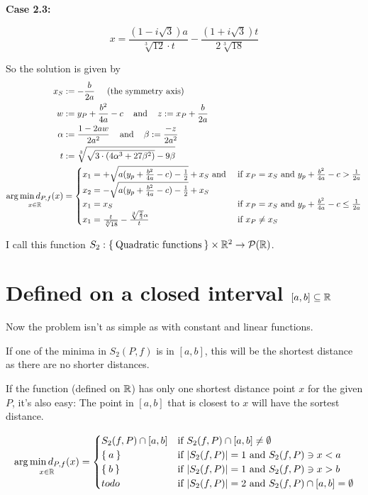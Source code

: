 \textbf{Case 2.3:} 

\[x = \frac{(1-i \sqrt{3})a}{\sqrt[3]{12} \cdot t}
     -\frac{(1+i\sqrt{3}) t}{2\sqrt[3]{18}}\]

\goodbreak
So the solution is given by
\begin{align*}
x_S &:= - \frac{b}{2a} \;\;\;\;\; \text{(the symmetry axis)}\\
w &:= y_P+\frac{b^2}{4a}-c \;\;\; \text{ and } \;\;\; z := x_P+\frac{b}{2a}\\
\alpha &:= \frac{1- 2 aw}{2 a^2} \;\;\;\text{ and }\;\;\; \beta := \frac{-z}{2 a^2}\\
t &:= \sqrt[3]{\sqrt{3 \cdot (4 \alpha^3 + 27 \beta^2)} -9\beta}\\
\underset{x\in\mathbb{R}}{\arg \min d_{P,f}(x)} &= \begin{cases}
     x_1 = +\sqrt{a (y_p + \frac{b^2}{4a} - c) - \frac{1}{2}} + x_S \text{ and }   &\text{if } x_P = x_S \text{ and } y_p + \frac{b^2}{4a} - c >  \frac{1}{2a} \\
     x_2 = -\sqrt{a (y_p + \frac{b^2}{4a} - c) - \frac{1}{2}} + x_S\\
     x_1 = x_S   &\text{if } x_P = x_S \text{ and } y_p + \frac{b^2}{4a} - c \leq  \frac{1}{2a} \\
     x_1 = \frac{t}{\sqrt[3]{18}} - \frac{\sqrt[3]{\frac{2}{3}} \alpha }{t}   &\text{if } x_P \neq x_S
    \end{cases}
\end{align*}

I call this function $S_2: \Set{\text{Quadratic functions}} \times \mathbb{R}^2 \rightarrow \mathcal{P}({\mathbb{R}})$.  
\clearpage

\section{Defined on a closed interval $[a,b] \subseteq \mathbb{R}$}
Now the problem isn't as simple as with constant and linear
functions.

If one of the minima in $S_2(P,f)$ is in $[a,b]$, this will be the
shortest distance as there are no shorter distances.


If the function (defined on $\mathbb{R}$) has only one shortest distance
point $x$ for the given $P$, it's also easy: The point in $[a,b]$ that
is closest to $x$ will have the sortest distance. 

\[\underset{x\in\mathbb{R}}{\arg \min d_{P,f}(x)} = \begin{cases}
 S_2(f, P) \cap [a,b] &\text{if } S_2(f, P) \cap [a,b] \neq \emptyset \\
              \Set{a} &\text{if } |S_2(f, P)| = 1 \text{ and } S_2(f, P) \ni x < a\\
              \Set{b} &\text{if } |S_2(f, P)| = 1 \text{ and } S_2(f, P) \ni x > b\\
                 todo &\text{if } |S_2(f, P)| = 2 \text{ and } S_2(f, P) \cap [a,b] = \emptyset
    \end{cases}\]
